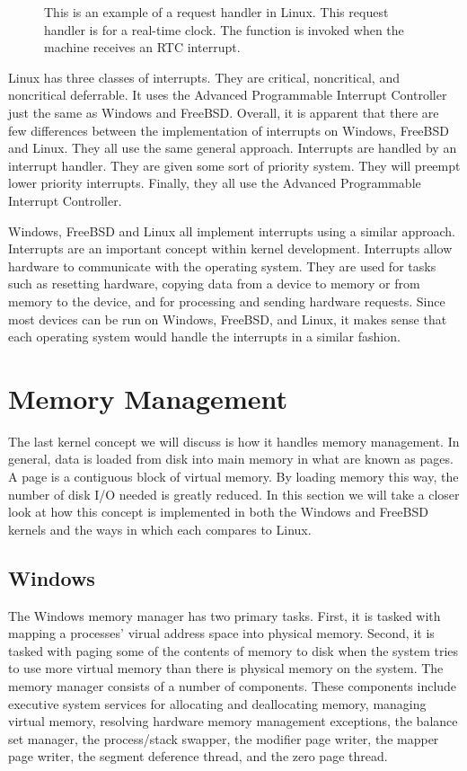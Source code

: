 \documentclass[journal,letterpaper,draftclsnofoot,onecolumn,10pt]{IEEEtran}
\begin{document}
\begin{figure}[H]
   
   \caption{This is an example of a request handler in Linux. This request handler is for a real-time clock. The function is invoked when the machine receives an RTC interrupt.}
\end{figure}

Linux has three classes of interrupts. They are critical, noncritical, and noncritical deferrable. It uses the Advanced Programmable Interrupt Controller just the same as Windows and FreeBSD. Overall, it is apparent that there are few differences between the implementation of interrupts on Windows, FreeBSD and Linux. They all use the same general approach. Interrupts are handled by an interrupt handler. They are given some sort of priority system. They will preempt lower priority interrupts. Finally, they all use the Advanced Programmable Interrupt Controller.

Windows, FreeBSD and Linux all implement interrupts using a similar approach. Interrupts are an important concept within kernel development. Interrupts allow hardware to communicate with the operating system. They are used for tasks such as resetting hardware, copying data from a device to memory or from memory to the device, and for processing and sending hardware requests. Since most devices can be run on Windows, FreeBSD, and Linux, it makes sense that each operating system would handle the interrupts in a similar fashion.

\section{Memory Management}

The last kernel concept we will discuss is how it handles memory management. In general, data is loaded from disk into main memory in what are known as pages. A page is a contiguous block of virtual memory. By loading memory this way, the number of disk I/O needed is greatly reduced. In this section we  will take a closer look at how this concept is implemented in both the Windows and FreeBSD kernels and the ways in which each compares to Linux.

\subsection{Windows}

The Windows memory manager has two primary tasks. First, it is tasked with mapping a processes' virual address space into physical memory. Second, it is tasked with paging some of the contents of memory to disk when the system tries to use more virtual memory than there is physical memory on the system. The memory manager consists of a number of components. These components include executive system services for allocating and deallocating memory, managing virtual memory, resolving hardware memory management exceptions, the balance set manager, the process/stack swapper, the modifier page writer, the mapper page writer, the segment deference thread, and the zero page thread.\cite{2ris12}
\end{document}
